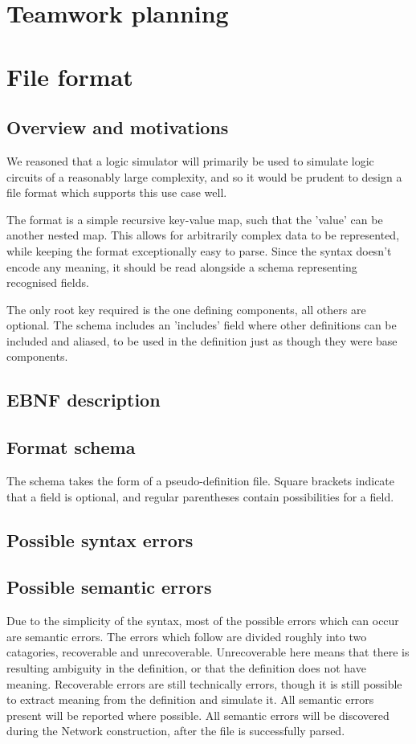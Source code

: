 \documentclass[a4paper]{article}
\begin{document}
\section{Teamwork planning}

\section{File format}
    \subsection{Overview and motivations}
        We reasoned that a logic simulator will primarily be used to simulate logic circuits of a reasonably large complexity, and so it would be prudent to design a file format which supports this use case well.

        The format is a simple recursive key-value map, such that the 'value' can be another nested map. This allows for arbitrarily complex data to be represented, while keeping the format exceptionally easy to parse. Since the syntax doesn't encode any meaning, it should be read alongside a schema representing recognised fields.

        The only root key required is the one defining components, all others are optional. The schema includes an 'includes' field where other definitions can be included and aliased, to be used in the definition just as though they were base components.

    \subsection{EBNF description}
    

    \subsection{Format schema}
    The schema takes the form of a pseudo-definition file. Square brackets indicate that a field is optional, and regular parentheses contain possibilities for a field.
    

    \subsection{Possible syntax errors}

    \subsection{Possible semantic errors}
        Due to the simplicity of the syntax, most of the possible errors which can occur are semantic errors. The errors which follow are divided roughly into two catagories, recoverable and unrecoverable. Unrecoverable here means that there is resulting ambiguity in the definition, or that the definition does not have meaning. Recoverable errors are still technically errors, though it is still possible to extract meaning from the definition and simulate it. All semantic errors present will be reported where possible. All semantic errors will be discovered during the Network construction, after the file is successfully parsed.
\end{document}
